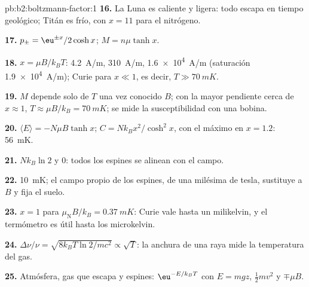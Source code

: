 \begin{solution}{pb:b2:boltzmann-factor:1}
\textbf{16.} La Luna es caliente y ligera: todo escapa en tiempo
geológico; Titán es frío, con $x = 11$ para el nitrógeno.

\textbf{17.} $p_\pm = \eu^{\pm x}/2\cosh x$; $M = n\mu\tanh x$.

\textbf{18.} $x = \mu B/k_BT$: \qty{4.2}{A/m}, \qty{310}{A/m}, \qty{1.6e4}{A/m}
(saturación \qty{1.9e4}{A/m}); Curie para $x \ll 1$, es decir, $T \gg \qty{70}{mK}$.

\textbf{19.} $M$ depende solo de $T$ una vez conocido $B$; con la mayor pendiente cerca de
$x \approx 1$, $T \approx \mu B/k_B = \qty{70}{mK}$; se mide la
susceptibilidad con una bobina.

\textbf{20.} $\langle E\rangle = -N\mu B\tanh x$; $C = Nk_Bx^2/\cosh^2x$, con el máximo en
$x = 1.2$: \qty{56}{mK}.

\textbf{21.} $Nk_B\ln 2$ y $0$: todos los espines se alinean con el campo.

\textbf{22.} \qty{10}{mK}; el campo propio de los espines, de una milésima de tesla, sustituye a $B$
y fija el suelo.

\textbf{23.} $x = 1$ para $\mu_{\text{N}}B/k_B = \qty{0.37}{mK}$: Curie vale hasta un
milikelvin, y el termómetro es útil hasta los microkelvin.

\textbf{24.} $\Delta\nu/\nu = \sqrt{8k_BT\ln2/mc^2} \propto \sqrt T$: la anchura
de una raya mide la temperatura del gas.

\textbf{25.} Atmósfera, gas que escapa y espines: $\eu^{-E/k_BT}$ con $E = mgz$,
$\tfrac12mv^2$ y $\mp\mu B$.
\end{solution}
